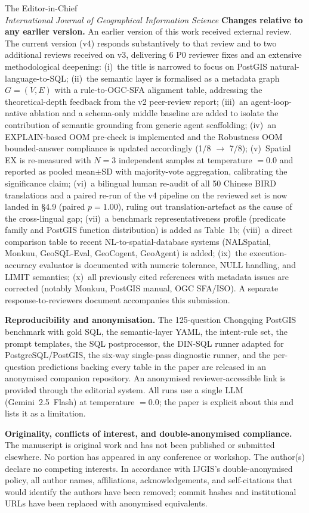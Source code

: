 \documentclass[11pt]{letter}
\begin{document}
\begin{letter}{The Editor-in-Chief \\ \emph{International Journal of Geographical Information Science}}
\medskip
\noindent\textbf{Changes relative to any earlier version.} An earlier version of this work received external review. The current version (v4) responds substantively to that review and to two additional reviews received on v3, delivering 6 P0 reviewer fixes and an extensive methodological deepening: (i)~the title is narrowed to focus on PostGIS natural-language-to-SQL; (ii)~the semantic layer is formalised as a metadata graph $G=(V,E)$ with a rule-to-OGC-SFA alignment table, addressing the theoretical-depth feedback from the v2 peer-review report; (iii)~an agent-loop-native ablation and a schema-only middle baseline are added to isolate the contribution of semantic grounding from generic agent scaffolding; (iv)~an EXPLAIN-based OOM pre-check is implemented and the Robustness OOM bounded-answer compliance is updated accordingly (1/8 $\rightarrow$ 7/8); (v)~Spatial EX is re-measured with $N=3$ independent samples at temperature $=0.0$ and reported as pooled mean$\pm$SD with majority-vote aggregation, calibrating the significance claim; (vi)~a bilingual human re-audit of all 50 Chinese BIRD translations and a paired re-run of the v4 pipeline on the reviewed set is now landed in §4.9 (paired $p=1.00$), ruling out translation-artefact as the cause of the cross-lingual gap; (vii)~a benchmark representativeness profile (predicate family and PostGIS function distribution) is added as Table~1b; (viii)~a direct comparison table to recent NL-to-spatial-database systems (NALSpatial, Monkuu, GeoSQL-Eval, GeoCogent, GeoAgent) is added; (ix)~the execution-accuracy evaluator is documented with numeric tolerance, NULL handling, and LIMIT semantics; (x)~all previously cited references with metadata issues are corrected (notably Monkuu, PostGIS manual, OGC SFA/ISO). A separate response-to-reviewers document accompanies this submission.

\medskip
\noindent\textbf{Reproducibility and anonymisation.} The 125-question Chongqing PostGIS benchmark with gold SQL, the semantic-layer YAML, the intent-rule set, the prompt templates, the SQL postprocessor, the DIN-SQL runner adapted for PostgreSQL/PostGIS, the six-way single-pass diagnostic runner, and the per-question predictions backing every table in the paper are released in an anonymised companion repository. An anonymised reviewer-accessible link is provided through the editorial system. All runs use a single LLM (Gemini~2.5~Flash) at temperature $=0.0$; the paper is explicit about this and lists it as a limitation.

\medskip
\noindent\textbf{Originality, conflicts of interest, and double-anonymised compliance.} The manuscript is original work and has not been published or submitted elsewhere. No portion has appeared in any conference or workshop. The author(s) declare no competing interests. In accordance with IJGIS's double-anonymised policy, all author names, affiliations, acknowledgements, and self-citations that would identify the authors have been removed; commit hashes and institutional URLs have been replaced with anonymised equivalents.


\end{letter}
\end{document}
